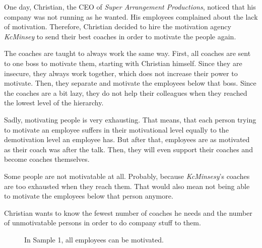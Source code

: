 



\makeheader

One day, Christian, the CEO of \textit{Super Arrangement Productions}, noticed that his company
was not running as he wanted. His employees complained about the lack of motivation.
Therefore, Christian decided to hire the motivation agency \textit{KcMinsey} to send their best
coaches in order to motivate the people again.

The coaches are taught to always work the same way. First, all coaches are sent to one boss to
motivate them, starting with Christian himself. Since they are insecure, they always work together,
which does not increase their power to motivate.
Then, they separate and motivate the employees below that boss. Since the coaches are a bit lazy,
they do not help their colleagues when they reached the lowest level of the hierarchy.

Sadly, motivating people is very exhausting. That means, that each person trying to motivate
an employee suffers in their motivational level equally to the demotivation level an employee
has. But after that, employees are as motivated as their coach was after the talk. Then,
they will even support their coaches and become coaches themselves.

Some people are not motivatable at all. Probably, because \textit{KcMinsesy}'s coaches
are too exhausted when they reach them. That would also mean not being able to motivate the
employees below that person anymore.

Christian wants to know the fewest number of coaches he needs and the number
of unmotivatable persons in order to do company stuff to them.

\begin{figure}
  \centering

  \caption{In Sample 1, all employees can be motivated.}
\end{figure}

